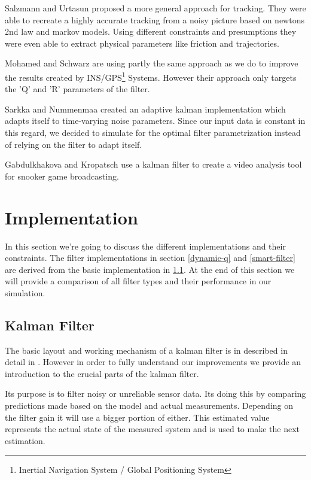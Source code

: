 \documentclass[notitlepage, a4paper, 11pt]{scrartcl}
\begin{document}
\begin{multicols}{2}
Salzmann and Urtasun \cite{salzmann} proposed a more general approach for tracking. 
They were able to recreate a highly accurate tracking from a noisy picture based on newtons 2nd law and markov models.
Using different constraints and presumptions they were even able to extract physical parameters like friction and trajectories.

Mohamed and Schwarz \cite{schwarz} are using partly the same approach as we do to improve the results created by INS/GPS\footnote{Inertial Navigation System / Global Positioning System} Systems.
However their approach only targets the 'Q' and 'R' parameters of the filter.

Sarkka and Nummenmaa \cite{sarkka} created an adaptive kalman implementation which adapts itself to time-varying noise parameters. Since our input data is constant in this regard,
we decided to simulate for the optimal filter parametrization instead of relying on the filter to adapt itself.

Gabdulkhakova and Kropatsch \cite{kropatsch} use a kalman filter to create a video analysis tool for snooker game broadcasting.

\section{Implementation} \label{implementation}
In this section we're going to discuss the different implementations and their constraints. The filter implementations in section \cref{dynamic-q} and \cref{smart-filter} are derived from
the basic implementation in \cref{kalman-basic}. At the end of this section we will provide a comparison of all filter types and their performance in our simulation.

\subsection{Kalman Filter} \label{kalman-basic}

The basic layout and working mechanism of a kalman filter is in described in detail in \cite{kalman}. 
However in order to fully understand our improvements we provide an introduction to the crucial parts of the kalman filter.

Its purpose is to filter noisy or unreliable sensor data. Its doing this by comparing predictions made based on the model and actual measurements. 
Depending on the filter gain it will use a bigger portion of either. This estimated value represents the actual state of the measured system and is used to make the next estimation.


\end{multicols}
\end{document}
